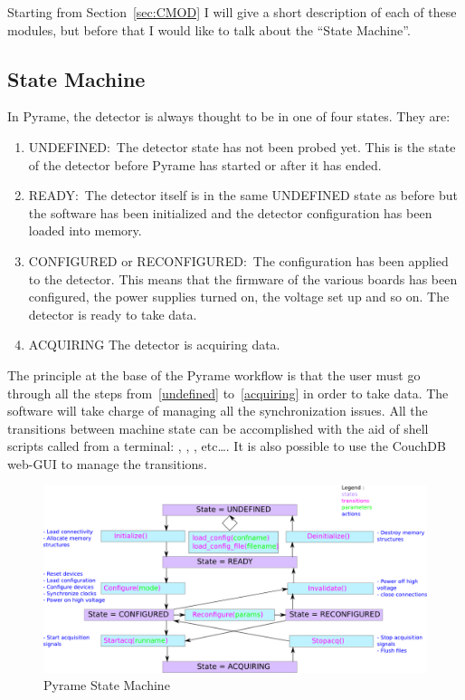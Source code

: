Starting from Section~\ref{sec:CMOD} I will give a short description
of each of these modules, but before that I would like to talk about
the ``State Machine''.

\subsection{State Machine}
In Pyrame, the detector is always thought to be in one of four
states. They are:
\begin{enumerate}
\item\label{undefined} UNDEFINED:\ The detector state has not been
  probed yet. This is the state of the detector before Pyrame has
  started or after it has ended.
\item READY:\ The detector itself is in the same UNDEFINED state as
  before but the software has been initialized and the detector
  configuration has been loaded into memory.
\item CONFIGURED or RECONFIGURED:\ The configuration has been applied
  to the detector. This means that the firmware of the various boards
  has been configured, the power supplies turned on, the voltage set
  up and so on. The detector is ready to take data.
\item\label{acquiring} ACQUIRING The detector is acquiring data.
\end{enumerate}
The principle at the base of the Pyrame workflow is that the user must
go through all the steps from~\ref{undefined} to~\ref{acquiring} in
order to take data. The software will take charge of managing all the
synchronization issues.  All the transitions between machine state can
be accomplished with the aid of shell scripts called from a terminal:
, ,
, etc\dots. It is also possible to use the
CouchDB web-GUI to manage the transitions.
\begin{figure}
  \includegraphics[width=\linewidth]{state_machine.doc.png}
  \caption{Pyrame State Machine}\label{fig:state-machine}
\end{figure}

